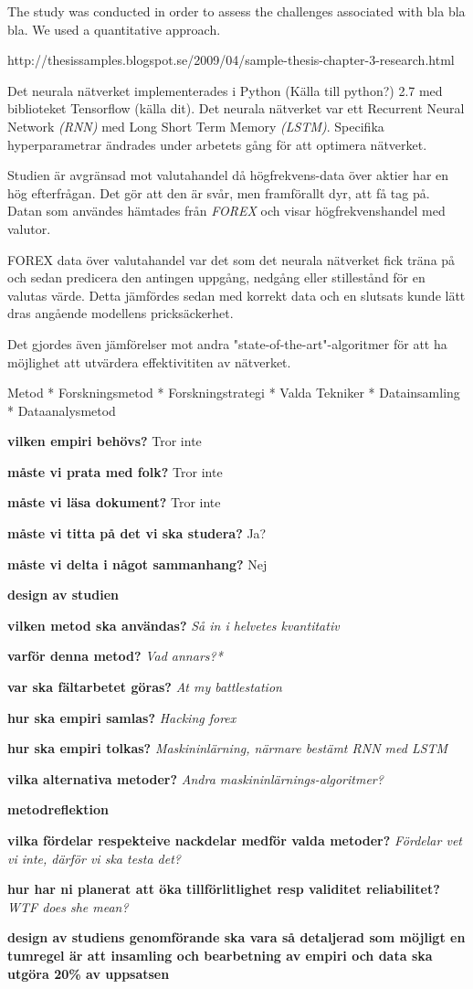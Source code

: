 The study was conducted in order to assess the challenges associated with bla bla bla. We used a quantitative approach.


http://thesissamples.blogspot.se/2009/04/sample-thesis-chapter-3-research.html

Det neurala nätverket implementerades i Python (Källa till python?) 2.7 med biblioteket Tensorflow (källa dit). Det neurala nätverket var ett Recurrent Neural Network \textit{(RNN)} med Long Short Term Memory \textit{(LSTM)}. Specifika hyperparametrar ändrades under arbetets gång för att optimera nätverket. 

Studien är avgränsad mot valutahandel då högfrekvens-data över aktier har en hög efterfrågan. Det gör att den är svår, men framförallt dyr, att få tag på. Datan som användes hämtades från \textit{FOREX} och visar högfrekvenshandel med valutor. 

FOREX data över valutahandel var det som det neurala nätverket fick träna på och sedan predicera den antingen uppgång, nedgång eller stillestånd för en valutas värde. Detta jämfördes sedan med korrekt data och en slutsats kunde lätt dras angående modellens pricksäckerhet. 

Det gjordes även jämförelser mot andra "state-of-the-art"-algoritmer för att ha möjlighet att utvärdera effektivititen av nätverket. 






Metod
* Forskningsmetod
* Forskningstrategi
* Valda Tekniker
* Datainsamling
* Dataanalysmetod

\textbf{vilken empiri behövs?} Tror inte

\textbf{måste vi prata med folk?} Tror inte

\textbf{måste vi läsa dokument?} Tror inte

\textbf{måste vi titta på det vi ska studera?} Ja?

\textbf{måste vi delta i något sammanhang?} Nej

\textbf{design av studien}

\textbf{vilken metod ska användas?}
\textit{Så in i helvetes kvantitativ}

\textbf{varför denna metod?}
\textit{Vad annars?*}

\textbf{var ska fältarbetet göras?}
\textit{At my battlestation}

\textbf{hur ska empiri samlas?}
\textit{Hacking forex}

\textbf{hur ska empiri tolkas?}
\textit{Maskininlärning, närmare bestämt RNN med LSTM}

\textbf{vilka alternativa metoder?}
\textit{Andra maskininlärnings-algoritmer?}

\textbf{metodreflektion}

\textbf{vilka fördelar respekteive nackdelar medför valda metoder?}
\textit{Fördelar vet vi inte, därför vi ska testa det?}

\textbf{hur har ni planerat att öka tillförlitlighet resp validitet reliabilitet?}
\textit{WTF does she mean?}

\textbf{design av studiens genomförande ska vara så detaljerad som möjligt en tumregel är att insamling och bearbetning av empiri och data ska utgöra 20\% av uppsatsen}
